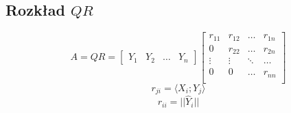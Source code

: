 \documentclass[../mn-notatki.tex]{subfiles}
\begin{document}
\subsection{Rozkład $QR$}
\begin{tcolorbox}
\[
A = QR = %
\begin{bmatrix}
Y_1 & Y_2 & \ldots & Y_n
\end{bmatrix}
\begin{bmatrix}
r_{11} & r_{12} & \ldots & r_{1n}\\
0      & r_{22} & \ldots & r_{2n}\\
\vdots & \vdots & \ddots & \ldots\\
0      & 0      & \ldots & r_{nn}\\
\end{bmatrix}
\]
\[
r_{ji} = \langle X_i; Y_j \rangle
\]
\[
r_{ii} = ||\hat{Y}_i||
\]
\end{tcolorbox}

\pagebreak
\end{document}

